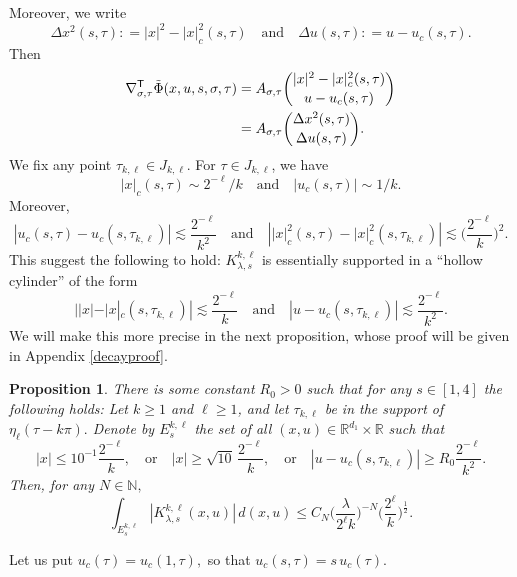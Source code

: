 \documentclass[leqno]{amsart}
\newtheorem{proposition}[theorem]{Proposition}
\theoremstyle{definition}
\theoremstyle{remark}
\numberwithin{equation}{section}
\newcommand{\R}{\mathbb{R}}
\newcommand{\N}{\mathbb{N}}
\begin{document}
Moreover, we write
\[
\Delta x^2 (s,\tau): = |x|^2-|x|_{c}^2 (s,\tau) \quad\text{and}\quad \Delta u(s,\tau): = u-u_c(s,\tau).
\]
Then
\begin{align}\notag
 \nabla_{\sigma,\tau}^{\mathsf T} \tilde \Phi (x,u,s,\sigma,\tau)
& =  A_{\sigma, \tau}\binom{|x|^2-|x|_{c}^2 (s,\tau)}{u-u_c(s,\tau)} \\
& =  A_{\sigma, \tau}\binom{\Delta x^2 (s,\tau)}{\Delta u(s,\tau)}. \label{nablaPhi}
\end{align}
We fix any point $\tau_{k,\ell} \in J_{k,\ell}$. For $\tau \in J_{k,\ell}$, we have 
\[
|x|_{c}(s,\tau) \sim 2^{-\ell}/k \quad\text{and}\quad |u_c(s,\tau)| \sim 1/k.
\]
Moreover,
\[
 \left|u_c(s,\tau)-u_c (s,\tau_{k,\ell}) \right| \lesssim \frac{2^{-\ell}}{k^2} \quad\text{and}\quad 
\left| |x|_c^2 (s,\tau)-|x|_c^2 (s,\tau_{k,\ell}) \right| \lesssim \Big(\frac{2^{-\ell}}{k}\Big)^2.
\]
This suggest the following to hold:  $K_{\lambda,s}^{k,\ell}$  is essentially supported  in a ``hollow cylinder''
of the form 
$$
||x|-|x|_c(s,\tau_{k,\ell})|  \lesssim \frac{2^{-\ell}}{k} \quad \text{and}\quad |u-u_c (s,\tau_{k,\ell})| \lesssim \frac{2^{-\ell}}{k^2}.
$$
 We will make this more precise in the next proposition, whose proof will be given in  Appendix \ref{decayproof}. 


\begin{proposition}\label{prop:decay-away}
There is some constant $R_0 > 0$ such that for any $s \in[1,4]$ the following holds:
Let $k\ge 1$ and $\ell\ge 1$, and let $\tau_{k,\ell}$ be in the support of $\eta_\ell(\tau-k \pi).$ Denote by $E_s^{k,\ell}$ the set of all $(x,u)\in \R^{d_1}\times \R$ such that 
\[
|x| \leq 10^{-1}\frac{2^{-\ell}}{k}, \quad\text{or}\quad 
|x| \ge \sqrt{10 }\, \frac{2^{-\ell}}{k}, \quad\text{or}\quad 
|u-u_c (s,\tau_{k,\ell})|  \ge R_0  \frac{2^{-\ell}}{k^2}.
\]
Then, for any $N\in\N,$ 
\[
\int_{E_s^{k,\ell}} |K_{\lambda,s}^{k,\ell}(x,u)| \, d(x,u) \le C_N
\Big(\frac{\lambda}{2^\ell k}\Big)^{-N}\Big(\frac{2^{\ell}}{k}\Big)^{\frac{1}{2}}.
\]
\end{proposition}
Let us put  $u_c(\tau)= u_c(1,\tau),$ so that $u_c(s,\tau)=s\,u_c(\tau).$
\end{document}
